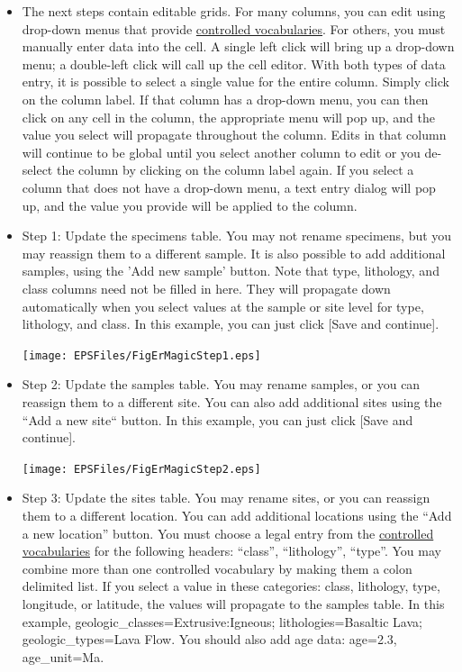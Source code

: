 \documentclass[11pt]{book}
\begin{document}
{\begin{itemize}
 \texttt{[image: EPSFiles/FigErMagicStep0.eps]}

 \item The next steps contain editable grids.  For many columns, you can edit using drop-down menus that provide \href{http://earthref.org/MAGIC/shortlists.htm}{controlled vocabularies}.  For others, you must manually enter data into the cell.  A single left click will bring up a drop-down menu; a double-left click will call up the cell editor.  With both types of data entry, it is possible to select a single value for the entire column. Simply click on the column label.  If that column has a drop-down menu, you can then click on any cell in the column, the appropriate menu will pop up, and the value you select will propagate throughout the column.  Edits in that column will continue to be global until you select another column to edit or you de-select the column by clicking on the column label again.  If you select a column that does not have a drop-down menu, a text entry dialog will pop up, and the value you provide will be applied to the column.

 \item Step 1: Update the specimens table.  You may not rename specimens, but you may reassign them to a different sample.  It is also possible to add additional samples, using the 'Add new sample' button.  Note that type, lithology, and class columns need not be filled in here.  They will propagate down automatically when you select values at the sample or site level for type, lithology, and class.  In this example, you can just click [Save and continue].

 \texttt{[image: EPSFiles/FigErMagicStep1.eps]}

\item Step 2:  Update the samples table.  You may rename samples, or you can reassign them to a different site.  You can also add additional sites using the ``Add a new site`` button.  In this example, you can just click [Save and continue].

 \texttt{[image: EPSFiles/FigErMagicStep2.eps]}

\item Step 3: Update the sites table.  You may rename sites, or you can reassign them to a different location.  You can add additional locations using the ``Add a new location'' button.  You must choose a legal entry from the \href{http://earthref.org/MAGIC/shortlists.htm}{controlled vocabularies} for the following headers: ``class'', ``lithology'', ``type''. You may combine more than one controlled vocabulary by making them a colon delimited list.  If you select a value in these categories: class, lithology, type, longitude, or latitude, the values will propagate to the samples table.  In this example,  geologic_classes=Extrusive:Igneous; lithologies=Basaltic Lava; geologic_types=Lava Flow.  You should also add age data: age=2.3, age_unit=Ma.


\end{itemize}}
\end{document}
